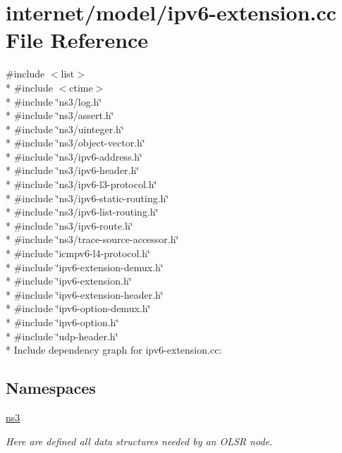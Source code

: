 \hypertarget{ipv6-extension_8cc}{}\section{internet/model/ipv6-\/extension.cc File Reference}
\label{ipv6-extension_8cc}
{\ttfamily \#include $<$list$>$}\\*
{\ttfamily \#include $<$ctime$>$}\\*
{\ttfamily \#include \char`\"{}ns3/log.\+h\char`\"{}}\\*
{\ttfamily \#include \char`\"{}ns3/assert.\+h\char`\"{}}\\*
{\ttfamily \#include \char`\"{}ns3/uinteger.\+h\char`\"{}}\\*
{\ttfamily \#include \char`\"{}ns3/object-\/vector.\+h\char`\"{}}\\*
{\ttfamily \#include \char`\"{}ns3/ipv6-\/address.\+h\char`\"{}}\\*
{\ttfamily \#include \char`\"{}ns3/ipv6-\/header.\+h\char`\"{}}\\*
{\ttfamily \#include \char`\"{}ns3/ipv6-\/l3-\/protocol.\+h\char`\"{}}\\*
{\ttfamily \#include \char`\"{}ns3/ipv6-\/static-\/routing.\+h\char`\"{}}\\*
{\ttfamily \#include \char`\"{}ns3/ipv6-\/list-\/routing.\+h\char`\"{}}\\*
{\ttfamily \#include \char`\"{}ns3/ipv6-\/route.\+h\char`\"{}}\\*
{\ttfamily \#include \char`\"{}ns3/trace-\/source-\/accessor.\+h\char`\"{}}\\*
{\ttfamily \#include \char`\"{}icmpv6-\/l4-\/protocol.\+h\char`\"{}}\\*
{\ttfamily \#include \char`\"{}ipv6-\/extension-\/demux.\+h\char`\"{}}\\*
{\ttfamily \#include \char`\"{}ipv6-\/extension.\+h\char`\"{}}\\*
{\ttfamily \#include \char`\"{}ipv6-\/extension-\/header.\+h\char`\"{}}\\*
{\ttfamily \#include \char`\"{}ipv6-\/option-\/demux.\+h\char`\"{}}\\*
{\ttfamily \#include \char`\"{}ipv6-\/option.\+h\char`\"{}}\\*
{\ttfamily \#include \char`\"{}udp-\/header.\+h\char`\"{}}\\*
Include dependency graph for ipv6-\/extension.cc\+:
\subsection*{Namespaces}
\begin{DoxyCompactItemize}
\item 
 \hyperlink{namespacens3}{ns3}
\begin{DoxyCompactList}\small\item\em Here are defined all data structures needed by an O\+L\+SR node. \end{DoxyCompactList}\end{DoxyCompactItemize}
